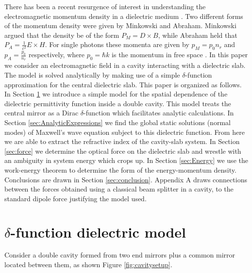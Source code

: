 \documentclass[twocolumn,english,pra,aps,superscriptaddress,floatfix]{revtex4-1}
\begin{document}
There has been a recent resurgence of interest in understanding the electromagnetic momentum density in a dielectric medium \cite{barnett,chiao,mansuripur,ketterle,feng,hinds,loudon}.  Two different forms of the momentum density were given by Minkowski and Abraham.  Minkowski argued that the density be of the form $P_M=D\times B$, while Abraham held that $P_A=\frac{1}{c^2}E\times H$.  For single photons these momenta are given by $p_M= p_{0} n_{r}$ and $p_A=\frac{p_{0}}{n_{r}}$ respectively, where $p_0=\hbar k$ is the momentum in free space . In this paper we consider an electromagnetic field in a cavity interacting with a dielectric slab. The model is solved analytically by making use of a simple $\delta$-function approximation for the central dielectric slab. 
This paper is organized as follows. In Section \ref{sec:deltafunctionmodel} we introduce a simple model for the spatial dependence of the dielectric permittivity function inside a double cavity. This model treats the central mirror as a Dirac $\delta$-function which facilitates analytic calculations. In Section \ref{sec:AnalyticExpressions} we find the global static solutions (normal modes) of Maxwell's wave equation subject to this dielectric function.  From here we are able to extract the refractive index of the cavity-slab system. In Section \ref{sec:force} we determine the optical force on the dielectric slab and wrestle with an ambiguity in system energy which crops up. In Section \ref{sec:Energy} we use the work-energy theorem to determine the form of the energy-momentum density. Conclusions are drawn in Section \ref{sec:conclusion}. Appendix A draws connections between the forces obtained using a classical beam splitter in a cavity, to the standard dipole force \cite{cohentannoudji} justifying the model used. 




\section{$\delta$-function dielectric model}
\label{sec:deltafunctionmodel}



Consider a double cavity formed from two end mirrors plus a common mirror located between them, as shown Figure \ref{fig:cavitysetup}.  
\end{document}
